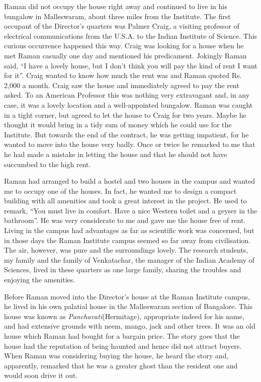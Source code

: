 Raman did not occupy the house right away and continued
to live in his bungalow in Malleswaram, about three miles from
the Institute. The first occupant of the Director's quarters was
Palmer Craig, a visiting professor of electrical communications
from the U.S.A. to the Indian Institute of Science. This curious
occurrence happened this way. Craig was looking for a house
when he met Raman casually one day and mentioned his
predicament. Jokingly Raman said, ``I have a lovely house, but
I don't think you will pay the kind of rent I want for it''. Craig
wanted to know how much the rent was and Raman quoted
Rs. 2,000 a month. Craig saw the house and immediately agreed
to pay the rent asked. To an American Professor this was nothing
very extravagant and, in any case, it was a lovely location and
a well-appointed bungalow. Raman was caught in a tight corner,
but agreed to let the house to Craig for two years. Maybe he
thought it would bring in a tidy sum of money which he could
use for the Institute. But towards the end of the contract, he was
getting impatient, for he wanted to move into the house very
badly. Once or twice he remarked to me that he had made a
mistake in letting the house and that he should not have
succumbed to the high rent.

Raman had arranged to build a hostel and two houses in
the campus and wanted me to occupy one of the houses. In fact,
he wanted me to design a compact building with all amenities
and took a great interest in the project. He used to remark, ``You
must live in comfort. Have a nice Western toilet and a geyser
in the bathroom''. He was very considerate to me and gave me
the house free of rent. Living in the campus had advantages as
far as scientific work was concerned, but in those days the Raman
Institute campus seemed so far away from civilisation. The air,
however, was pure and the surroundings lovely. The research
students, my family and the family of Venkatachar, the manager
of the Indian Academy of Sciences, lived in these quarters as one
large family, sharing the troubles and enjoying the amenities.

Before Raman moved into the Director's house at the Raman
Institute campus, he lived in his own palatial house in the
Malleswa\-ram section of Bangalore. This house was known as
{\em Panchavati}\break \hbox{(Hermitage)}, appropriate indeed for his name, and
had extensive grounds with neem, mango, jack and other trees.
It was an old house which Raman had bought for a bargain price.
The story goes that the house had the reputation of being haunted
and hence did not attract buyers. When Raman was considering
buying the house, he heard the story and, apparently, remarked
that he was a greater ghost than the resident one and would soon
drive it out.

